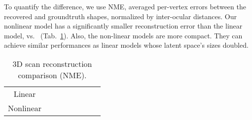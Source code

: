 To quantify the difference, we use NME, averaged per-vertex errors between the recovered and groundtruth shapes, normalized by inter-ocular distances. 
Our nonlinear model has a significantly smaller reconstruction error than the linear model,  vs.~ (Tab.~\ref{tab:shape_representation_number}). 
Also, the non-linear models are more compact. 
They can achieve similar performances as linear models whose latent space’s sizes doubled.

\begin{table}[t!]
\footnotesize
\caption{\small{3D scan reconstruction comparison (NME).}} 
\label{tab:shape_representation_number}
\vspace{-6mm}
\begin{center}
\begin{tabular}{ cccccccc}
\toprule 
     &  &  &  \\ \midrule
Linear    &  &  &  \\
Nonlinear &  &  &  \\
\bottomrule
\end{tabular}
\end{center}
\figvspace
\end{table}



